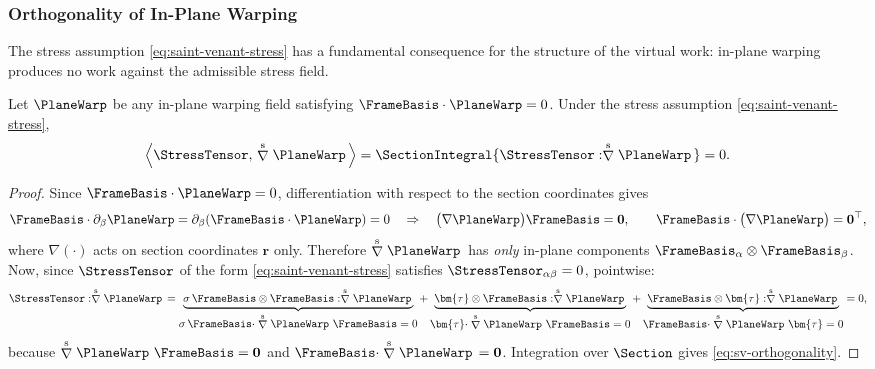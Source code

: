 \subsubsection{Orthogonality of In-Plane Warping}\label{sec:sv-orthogonality}

The stress assumption \eqref{eq:saint-venant-stress} has a fundamental consequence for the structure of the virtual work: in-plane warping produces no work against the admissible stress field.

\begin{proposition}\label{prop:sv-orthogonality}
Let \(\PlaneWarp\) be any in-plane warping field satisfying \(\FrameBasis\cdot\PlaneWarp=0\). Under the stress assumption \eqref{eq:saint-venant-stress},
\begin{equation}
\left<\StressTensor,\,\stackrel{\rm s}{\nabla}\PlaneWarp\,\right>=\SectionIntegral{\StressTensor : \stackrel{\rm s}{\nabla}\PlaneWarp\,}=0.
\label{eq:sv-orthogonality}
\end{equation}
\end{proposition}
\begin{proof}
Since \(\FrameBasis\cdot\PlaneWarp=0\), differentiation with respect to the section coordinates gives
\[
\FrameBasis\cdot\partial_{\beta}\PlaneWarp=\partial_{\beta}(\FrameBasis\cdot\PlaneWarp)=0
\quad\Rightarrow\quad
\big(\nabla\PlaneWarp\big)\FrameBasis=\mathbf{0},
\qquad
\FrameBasis\cdot\big(\nabla\PlaneWarp\big)=\mathbf{0}^{\top},
\]
where \(\nabla(\cdot)\) acts on section coordinates \(\bm{r}\) only.
Therefore \(\stackrel{\rm s}{\nabla}\PlaneWarp\,\) has \emph{only} in-plane components \(\FrameBasis_\alpha\otimes\FrameBasis_\beta\).
Now, since \(\StressTensor\) of the form \eqref{eq:saint-venant-stress} satisfies \(\StressTensor_{\alpha\beta}=0\), pointwise:
\[
\StressTensor:\stackrel{\rm s}{\nabla}\PlaneWarp\,
=\underbrace{\sigma\,\FrameBasis\otimes\FrameBasis:\stackrel{\rm s}{\nabla}\PlaneWarp\,}_{\displaystyle \sigma\,\FrameBasis\cdot\stackrel{\rm s}{\nabla}\PlaneWarp\,\,\FrameBasis=0}
+\underbrace{\bm{\tau}\otimes\FrameBasis : \stackrel{\rm s}{\nabla}\PlaneWarp\,}_{\displaystyle \bm{\tau}\cdot\stackrel{\rm s}{\nabla}\PlaneWarp\,\,\FrameBasis=0}
+\underbrace{\FrameBasis\otimes\bm{\tau} : \stackrel{\rm s}{\nabla}\PlaneWarp\,}_{\displaystyle \FrameBasis\cdot\stackrel{\rm s}{\nabla}\PlaneWarp\,\,\bm{\tau}=0}
=0,
\]
because \(\stackrel{\rm s}{\nabla}\PlaneWarp\,\,\FrameBasis=\mathbf{0}\) and \(\FrameBasis \cdot\stackrel{\rm s}{\nabla}\PlaneWarp\,=\mathbf{0}\). Integration over \(\Section\) gives \eqref{eq:sv-orthogonality}.
\end{proof}

